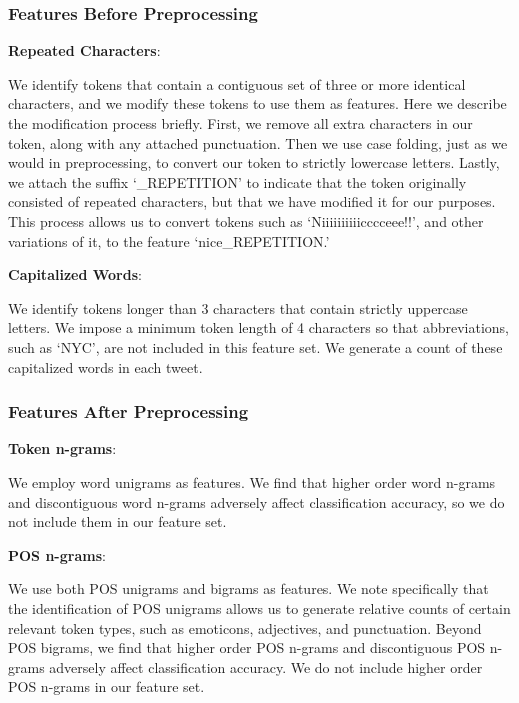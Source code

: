 \documentclass[11pt,letterpaper]{article}
\begin{document}
\subsubsection{Features Before Preprocessing}

\vspace{3 mm}
\noindent
{\bf Repeated Characters}:

We identify tokens that contain a contiguous set of three or more identical characters, and we modify these tokens to use them as features. Here we describe the modification process briefly. First, we remove all extra characters in our token, along with any attached punctuation. Then we use case folding, just as we would in preprocessing, to convert our token to strictly lowercase letters. Lastly, we attach the suffix ‘\_REPETITION’ to indicate that the token originally consisted of repeated characters, but that we have modified it for our purposes. This process allows us to convert tokens such as  ‘Niiiiiiiiiicccceee!!’, and other variations of it, to the feature ‘nice\_REPETITION.’

\vspace{3 mm}
\noindent
{\bf Capitalized Words}:

We identify tokens longer than 3 characters that contain strictly uppercase letters. We impose a minimum token length of 4 characters so that abbreviations, such as ‘NYC’, are not included in this feature set. We generate a count of these capitalized words in each tweet.

\subsubsection{Features After Preprocessing}

\vspace{3 mm}
\noindent
{\bf Token n-grams}:

We employ word unigrams as features. We find that higher order word n-grams and discontiguous word n-grams adversely affect classification accuracy, so we do not include them in our feature set.

\vspace{3 mm}
\noindent
{\bf POS n-grams}:

We use both POS unigrams and bigrams as features. We note specifically that the identification of POS unigrams allows us to generate relative counts of certain relevant token types, such as emoticons, adjectives, and punctuation. Beyond POS bigrams, we find that higher order POS n-grams and discontiguous POS n-grams adversely affect classification accuracy. We do not include higher order POS n-grams in our feature set.
\end{document}
